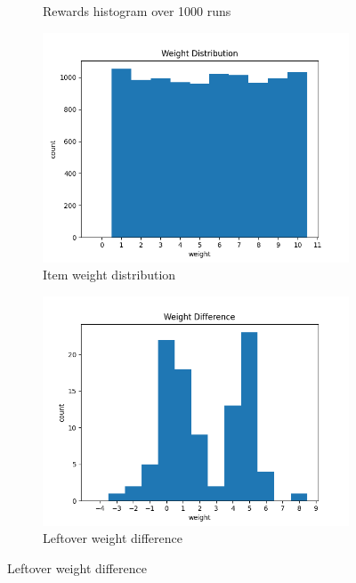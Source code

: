 \begin{figure}[htbp]
\begin{subfigure}[htbp]{0.24\textwidth}
        \caption{Rewards histogram over 1000 runs}
        \label{fig:fig_1}
    \end{subfigure}
    \hfill
    \begin{subfigure}[htbp]{0.24\textwidth}
        \centering
        \includegraphics[width=\textwidth]{fig/asg1_weight_dist.png}
        \caption{Item weight distribution}
        \label{fig:weightdist}
    \end{subfigure}
    \hfill
    \begin{subfigure}[htbp]{0.24\textwidth}
        \centering
        \includegraphics[width=\textwidth]{fig/asg1_weight_diff.png}
        \caption{Leftover weight difference}
        \label{fig:weightdiff}
    \end{subfigure}
\end{figure}

